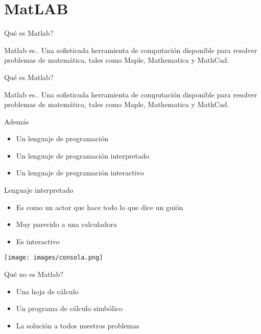 \documentclass{bredelebeamer}
\begin{document}



\section{MatLAB}

\begin{frame}{Qué es Matlab?}
\begin{block}{Matlab es..}
Una sofisticada herramienta de computación disponible para resolver problemas de matemática, tales como Maple, Mathematica y MathCad.
\end{block}
\end{frame}

\begin{frame}{Qué es Matlab?}
\begin{block}{Matlab es..}
Una sofisticada herramienta de computación disponible para resolver problemas de matemática, tales como Maple, Mathematica y MathCad.
\end{block}
\Large Además \normalsize
\begin{itemize}
\item Un lenguaje de programación
\item Un lenguaje de programación interpretado
\item Un lenguaje de programación interactivo
\end{itemize}
\end{frame}

\begin{frame}{Lenguaje interpretado}
\begin{itemize}
\item Es como un actor que hace todo lo que dice un guión
\item Muy parecido a una calculadora
\item Es interactivo
\end{itemize}
\begin{center}
\texttt{[image: images/consola.png]}
\end{center}
\end{frame}

\begin{frame}{Qué no es Matlab?}
\begin{itemize}
\item Una hoja de cálculo
\item Un programa de cálculo simbólico
\item La solución a todos nuestros problemas
\end{itemize}
\end{frame}
\end{document}
